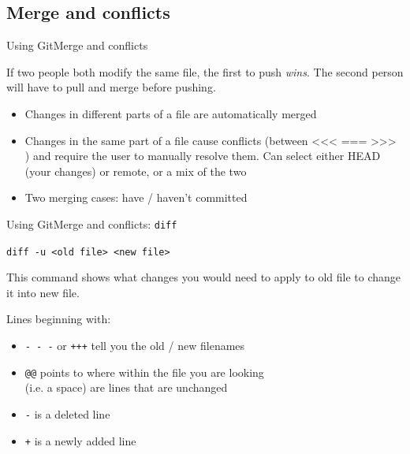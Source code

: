 \documentclass[10pt,compress]{beamer} %
\begin{document}
\subsection{Merge and conflicts}
\begin{frame}{Using Git}{Merge and conflicts}

If two people both modify the same file, the first to push \emph{wins}.
The second person will have to pull and merge before pushing.

\begin{itemize}
 \item Changes in different parts of a file are automatically merged
 \item Changes in the same part of a file cause conflicts (between <<<
=== >>> ) and require the user to manually resolve them. Can
select either HEAD (your changes) or remote, or a mix of the two
\item Two merging cases: have / haven't committed
\end{itemize}

\end{frame}

\begin{frame}{Using Git}{Merge and conflicts: \texttt{diff}}

\texttt{diff -u <old file> <new file>}

This command shows what changes you would need to apply to old file to change it into
new file.

Lines beginning with:
\begin{itemize}
 \item \texttt{- - -} or \texttt{+++} tell you the old / new filenames
 \item \texttt{@@} points to where within the file you are looking \\
       (i.e. a space) are lines that are unchanged
 \item \texttt{-} is a deleted line
 \item \texttt{+} is a newly added line
\end{itemize}

\end{frame}
\end{document}
